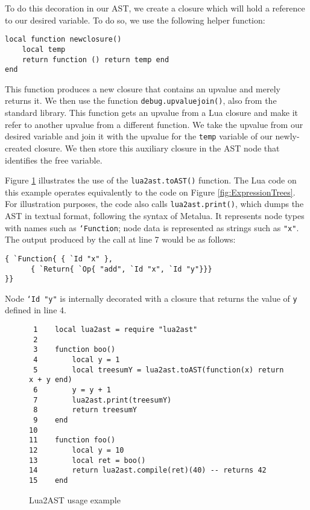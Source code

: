 \documentclass[english]{llncs}
\begin{document}
To do this decoration in our AST, we create a closure which will hold a reference
to our desired variable.
To do so, we use the following helper function:

\begin{verbatim}
local function newclosure()
    local temp
    return function () return temp end
end
\end{verbatim}

This function produces a new closure that contains an upvalue and merely returns it.
We then use the function \texttt{debug.upvaluejoin()}, also from the standard library.
This function gets an upvalue from a Lua closure and make it refer to another upvalue
from a different function.
We take the upvalue from our desired variable and join it with the upvalue for the \texttt{temp} variable of our newly-created closure.
We then store this auxiliary closure in the AST node that identifies the free variable.

Figure \ref{fig:Lua2ASTExample} illustrates the use of the \texttt{lua2ast.toAST()} function.
The Lua code on this example operates equivalently to the code on Figure \ref{fig:ExpressionTrees}.
For illustration purposes, the code also calls \texttt{lua2ast.print()}, which dumps the AST in textual format,
following the syntax of Metalua. It represents node types with names such as \texttt{`Function}; node data is represented as strings such as \texttt{"x"}.
The output produced by the call at line 7 would be as follows:

\begin{verbatim}
{ `Function{ { `Id "x" },
      { `Return{ `Op{ "add", `Id "x", `Id "y"}}}
}}
\end{verbatim}

Node \texttt{`Id "y"} is internally decorated with a closure that returns the value of \texttt{y} defined in line 4.

\begin{figure}[t]
\begin{verbatim}
 1    local lua2ast = require "lua2ast"
 2
 3    function boo()
 4        local y = 1
 5        local treesumY = lua2ast.toAST(function(x) return x + y end)
 6        y = y + 1
 7        lua2ast.print(treesumY)
 8        return treesumY
 9    end
10
11    function foo()
12        local y = 10
13        local ret = boo()
14        return lua2ast.compile(ret)(40) -- returns 42
15    end
\end{verbatim}
\protect\caption{\label{fig:Lua2ASTExample}Lua2AST usage example}
\end{figure}
\end{document}
